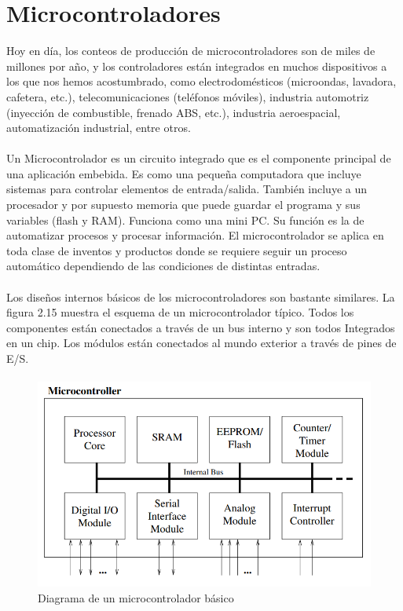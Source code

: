 \section{Microcontroladores}
Hoy en día, los conteos de producción de microcontroladores son de miles de millones por año, y los controladores están integrados en muchos dispositivos a los que nos hemos acostumbrado, como electrodomésticos (microondas, lavadora, cafetera, etc.), telecomunicaciones (teléfonos móviles), industria automotriz (inyección de combustible, frenado ABS, etc.), industria aeroespacial, automatización industrial, entre otros.
\paragraph{}
Un Microcontrolador es un circuito integrado que es el componente principal de una aplicación embebida. Es como una pequeña computadora que incluye sistemas para controlar elementos de entrada/salida. También incluye a un procesador y por supuesto memoria que puede guardar el programa y sus variables (flash y RAM).  Funciona como una mini PC. Su función es la de automatizar procesos y procesar información.
El microcontrolador se aplica en toda clase de inventos y productos donde se requiere seguir un proceso automático dependiendo de las condiciones de distintas entradas.
\paragraph{}
Los diseños internos básicos de los microcontroladores son bastante similares. La figura 2.15 muestra el esquema de un microcontrolador típico. Todos los componentes están conectados a través de un bus interno y son todos Integrados en un chip. Los módulos están conectados al mundo exterior a través de pines de E/S.
\paragraph{}
\begin{figure}[H]
	\centering
	\includegraphics[scale=.9]{Capitulo2/images/microcontrolador.png}
	\caption{Diagrama de un microcontrolador básico}
	\label{fig:diagrama_dispMonitoreo}
\end{figure}
